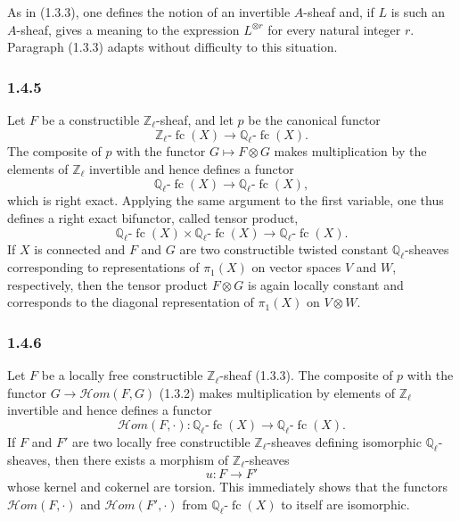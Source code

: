 \documentclass[11pt]{article}
\providecommand{\cHom}{\mathcal{H}om}
\providecommand{\fc}{\operatorname{fc}}
\begin{document}
As in (1.3.3), one defines the notion of an invertible \(A\)-sheaf and, if \(L\) is such an \(A\)-sheaf, gives a meaning to the expression \(L^{\otimes r}\) for every natural integer \(r\). Paragraph (1.3.3) adapts without difficulty to this situation.

\subsubsection*{1.4.5}
Let \(F\) be a constructible \(\mathbb Z_\ell\)-sheaf, and let \(p\) be the canonical functor
\[
\mathbb Z_\ell\text{-}\fc(X)\longrightarrow \mathbb Q_\ell\text{-}\fc(X).
\]
The composite of \(p\) with the functor \(G\mapsto F\otimes G\) makes multiplication by the elements of \(\mathbb Z_\ell\) invertible and hence defines a functor
\[
\mathbb Q_\ell\text{-}\fc(X)\longrightarrow \mathbb Q_\ell\text{-}\fc(X),
\]
which is right exact. Applying the same argument to the first variable, one thus defines a right exact bifunctor, called tensor product,
\[
\mathbb Q_\ell\text{-}\fc(X)\times \mathbb Q_\ell\text{-}\fc(X)
\longrightarrow \mathbb Q_\ell\text{-}\fc(X).
\]
If \(X\) is connected and \(F\) and \(G\) are two constructible twisted constant \(\mathbb Q_\ell\)-sheaves corresponding to representations of \(\pi_1(X)\) on vector spaces \(V\) and \(W\), respectively, then the tensor product \(F\otimes G\) is again locally constant and corresponds to the diagonal representation of \(\pi_1(X)\) on \(V\otimes W\).

\subsubsection*{1.4.6}
Let \(F\) be a locally free constructible \(\mathbb Z_\ell\)-sheaf (1.3.3). The composite of \(p\) with the functor \(G\longrightarrow\cHom(F,G)\) (1.3.2) makes multiplication by elements of \(\mathbb Z_\ell\) invertible and hence defines a functor
\[
\cHom(F,\cdot):\mathbb Q_\ell\text{-}\fc(X)\longrightarrow \mathbb Q_\ell\text{-}\fc(X).
\]
If \(F\) and \(F'\) are two locally free constructible \(\mathbb Z_\ell\)-sheaves defining isomorphic \(\mathbb Q_\ell\)-sheaves, then there exists a morphism of \(\mathbb Z_\ell\)-sheaves
\[
u:F\longrightarrow F'
\]
whose kernel and cokernel are torsion. This immediately shows that the functors \(\cHom(F,\cdot)\) and \(\cHom(F',\cdot)\) from \(\mathbb Q_\ell\text{-}\fc(X)\) to itself are isomorphic.
\end{document}
